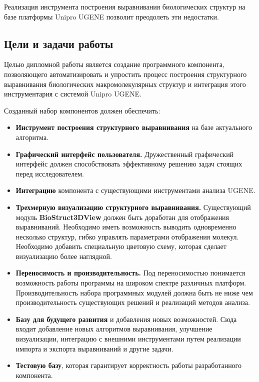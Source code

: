 \documentclass[a4paper, 12pt, titlepage, utf8]{extarticle}
\newcommand{\class}{\textbf}
\newcommand{\module}{\class}
\begin{document}
Реализация инструмента построения выравнивания биологических структур на базе платформы Unipro UGENE позволит преодолеть эти недостатки.

\subsection{Цели и задачи работы}
Целью дипломной работы является создание программного компонента, позволяющего автоматизировать и упростить процесс построения структурного выравнивания биологических макромолекулярных структур и интеграция этого инструментария с системой Unipro UGENE.

Созданный набор компонентов должен обеспечить:
\begin{itemize}
    \item \textbf{Инструмент построения структурного выравнивания} на базе актуального алгоритма.

    \item \textbf{Графический интерфейс пользователя.} Дружественный графический интерфейс должен способствовать эффективному решению задач стоящих перед исследователем.

    \item \textbf{Интеграцию} компонента с существующими инструментами анализа UGENE. 

    \item \textbf{Трехмерную визуализацию структурного выравнивания.} Существующий модуль \module{BioStruct3DView} должен быть доработан для отображения выравниваний. Необходимо иметь возможность выводить одновременно несколько структур, гибко управлять параметрами отображения молекул. Необходимо добавить специальную цветовую схему, которая сделает визуализацию более наглядной.

    \item \textbf{Переносимость и производительность.} Под переносимостью понимается возможность работы программы на широком спектре различных платформ. Производительность набора программных модулей должна быть не ниже чем производительность существующих решений и реализаций методов анализа.

    \item \textbf{Базу для будущего развития} и добавления новых возможностей. Сюда входит добавление новых алгоритмов выравнивания, улучшение визуализации, интеграцию с внешними инструментами путем реализации импорта и экспорта выравниваний и другие задачи.

    \item \textbf{Тестовую базу}, которая гарантирует корректность работы разработанного компонента.
\end{itemize}
\end{document}
